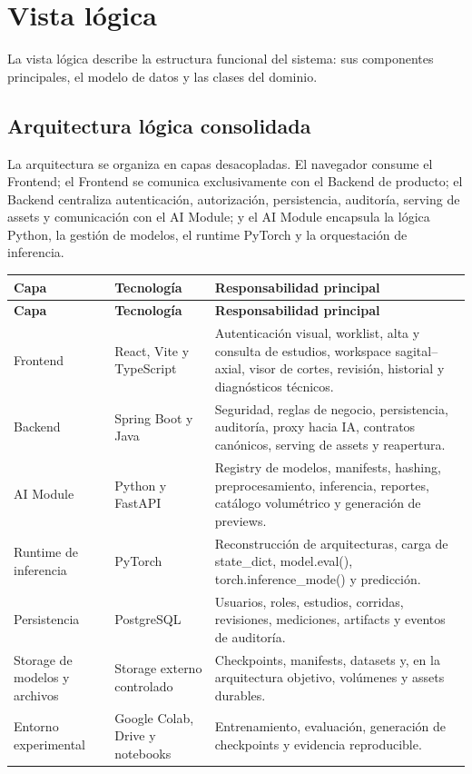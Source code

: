 \section{Vista lógica}

La vista lógica describe la estructura funcional del sistema: sus componentes principales, el modelo de datos y las clases del dominio.

\subsection{Arquitectura lógica consolidada}

La arquitectura se organiza en capas desacopladas. El navegador consume el Frontend; el Frontend se comunica exclusivamente con el Backend de producto; el Backend centraliza autenticación, autorización, persistencia, auditoría, serving de assets y comunicación con el AI Module; y el AI Module encapsula la lógica Python, la gestión de modelos, el runtime PyTorch y la orquestación de inferencia.

{\footnotesize
\setlength{\LTleft}{0pt}
\setlength{\LTright}{0pt}
\setlength{\tabcolsep}{2pt}
\renewcommand{\arraystretch}{1.18}
\label{tab:arch-logica-capas}
\begin{longtable}{>{\raggedright\arraybackslash}p{} >{\raggedright\arraybackslash}p{} >{\raggedright\arraybackslash}p{}}
\hline
\textbf{Capa} & \textbf{Tecnología} & \textbf{Responsabilidad principal} \\
\hline
\endfirsthead
\hline
\textbf{Capa} & \textbf{Tecnología} & \textbf{Responsabilidad principal} \\
\hline
\endhead
\hline
\endfoot
Frontend & React, Vite y TypeScript & Autenticación visual, worklist, alta y consulta de estudios, workspace sagital–axial, visor de cortes, revisión, historial y diagnósticos técnicos. \\
Backend & Spring Boot y Java & Seguridad, reglas de negocio, persistencia, auditoría, proxy hacia IA, contratos canónicos, serving de assets y reapertura. \\
AI Module & Python y FastAPI & Registry de modelos, manifests, hashing, preprocesamiento, inferencia, reportes, catálogo volumétrico y generación de previews. \\
Runtime de inferencia & PyTorch & Reconstrucción de arquitecturas, carga de state\_dict, model.eval(), torch.inference\_mode() y predicción. \\
Persistencia & PostgreSQL & Usuarios, roles, estudios, corridas, revisiones, mediciones, artifacts y eventos de auditoría. \\
Storage de modelos y archivos & Storage externo controlado & Checkpoints, manifests, datasets y, en la arquitectura objetivo, volúmenes y assets durables. \\
Entorno experimental & Google Colab, Drive y notebooks & Entrenamiento, evaluación, generación de checkpoints y evidencia reproducible. \\
\hline
\end{longtable}
}

